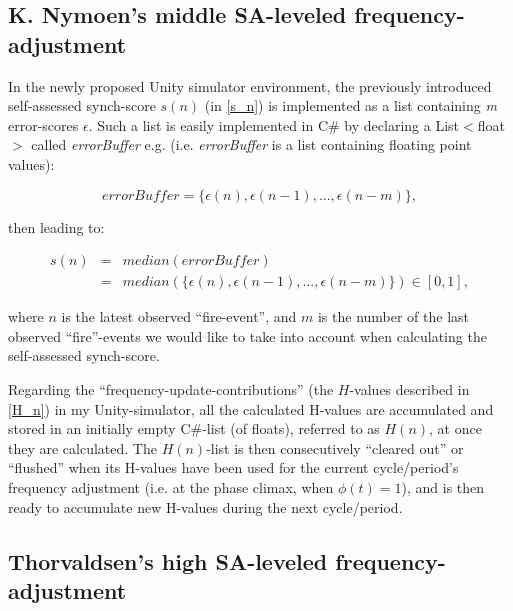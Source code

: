 	
	\subsection{K. Nymoen's middle SA-leveled frequency-adjustment}
	
	In the newly proposed Unity simulator environment, the previously introduced self-assessed synch-score $s(n)$ (in \ref{s_n}) is implemented as a list containing \textit{m} error-scores $\epsilon$. Such a list is easily implemented in C\# by declaring a List$<$float$>$ called \textit{errorBuffer} e.g. (i.e. \textit{errorBuffer} is a list containing floating point values):
	
	\begin{equation}
	\label{error_buffer}
		errorBuffer = \{\epsilon(n), \epsilon(n-1), ... , \epsilon(n-m)\},
	\end{equation} \nl
	
	then leading to:
	
	\begin{equation}
	\label{self_assessed_synch}
		\begin{array}{rrclcl}
		s(n) & = & median(errorBuffer) \\ 
		& = & median(\{\epsilon(n), \epsilon(n-1), ... , \epsilon(n-m)\}) \in [0, 1],
		\end{array}
	\end{equation} \nl
	
	where $n$ is the latest observed ``fire-event'', and $m$ is the number of the last observed ``fire''-events we would like to take into account when calculating the self-assessed synch-score. \nl
	
	Regarding the ``frequency-update-contributions'' (the $H$-values described in \ref{H_n}) in my Unity-simulator, all the calculated H-values are accumulated and stored in an initially empty C\#-list (of floats), referred to as $H(n)$, at once they are calculated. The $H(n)$-list is then consecutively ``cleared out'' or ``flushed'' when its H-values have been used for the current cycle/period's frequency adjustment (i.e. at the phase climax, when $\phi(t)=1$), and is then ready to accumulate new H-values during the next cycle/period.
	
	
	\subsection{Thorvaldsen's high SA-leveled frequency-adjustment}
	
